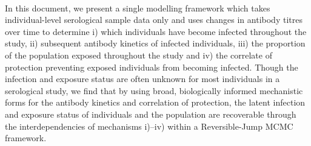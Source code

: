 \paragraph{}In this document, we present a single modelling framework which takes individual-level serological sample data only and uses changes in antibody titres over time to determine i) which individuals have become infected throughout the study, 
ii) subsequent antibody kinetics of infected individuals, iii) the proportion of the population exposed throughout the study and iv) the correlate of protection preventing exposed individuals from becoming infected. Though the infection and exposure status are often unknown for most individuals in a serological study, we find that by using broad, biologically informed mechanistic forms for the antibody kinetics and correlation of protection, the latent infection and exposure status of individuals and the population are recoverable through the interdependencies of mechanisms i)–iv) within a Reversible-Jump MCMC framework. 
